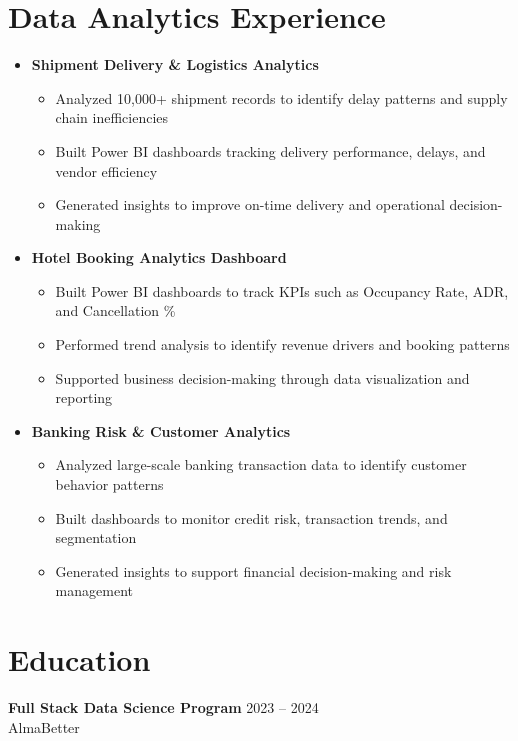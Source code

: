 \documentclass[letterpaper,11pt]{article}
\begin{document}
\section{Data Analytics Experience}
\begin{itemize}[leftmargin=*]

\item \textbf{Shipment Delivery \& Logistics Analytics}
\begin{itemize}
\item Analyzed 10,000+ shipment records to identify delay patterns and supply chain inefficiencies
\item Built Power BI dashboards tracking delivery performance, delays, and vendor efficiency
\item Generated insights to improve on-time delivery and operational decision-making
\end{itemize}

\item \textbf{Hotel Booking Analytics Dashboard}
\begin{itemize}
\item Built Power BI dashboards to track KPIs such as Occupancy Rate, ADR, and Cancellation \%
\item Performed trend analysis to identify revenue drivers and booking patterns
\item Supported business decision-making through data visualization and reporting
\end{itemize}

\item \textbf{Banking Risk \& Customer Analytics}
\begin{itemize}
\item Analyzed large-scale banking transaction data to identify customer behavior patterns
\item Built dashboards to monitor credit risk, transaction trends, and segmentation
\item Generated insights to support financial decision-making and risk management
\end{itemize}

\end{itemize}

\section{Education}
\textbf{Full Stack Data Science Program} \hfill 2023 -- 2024 \\
AlmaBetter \\
\end{document}
